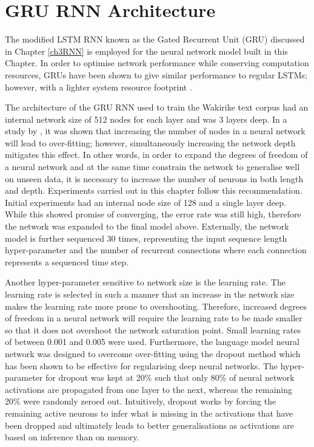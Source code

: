 \section{GRU RNN Architecture}
The modified LSTM RNN known as the Gated Recurrent Unit (GRU) discussed in Chapter \ref{ch3RNN} is employed for the neural network model built in this Chapter.  In order to optimise network performance while conserving computation resources, GRUs have been shown to give similar performance to regular LSTMs; however, with a lighter system resource footprint \citep{cho2014learning}. 

The architecture of the GRU RNN used to train the Wakirike text corpus had an internal network size of 512 nodes for each layer and was 3 layers deep. In a study by \citep{goodfellow2013multi}, it was shown that increasing the number of nodes in a neural network will lead to over-fitting; however, simultaneously increasing the network depth mitigates this effect.  In other words, in order to expand the degrees of freedom of a neural network and at the same time constrain the network to generalise well on unseen data, it is necessary to increase the number of neurons in both length and depth.  Experiments carried out in this chapter follow this recommendation. Initial experiments had an internal node size of 128 and a single layer deep.  While this showed promise of converging, the error rate was still high, therefore the network was expanded to the final model above.   Externally, the network model is further  sequenced 30 times, representing the input sequence length hyper-parameter and the number of recurrent connections where each connection represents a sequenced time step. 

Another hyper-parameter sensitive to network size is the learning rate.  The learning rate is selected in such a manner that an increase in the network size makes the learning rate more prone to overshooting.  Therefore, increased degrees of freedom in a neural network will require the learning rate to be made smaller so that it does not overshoot the network saturation point.  Small learning rates of between 0.001 and 0.005 were used. Furthermore, the language model neural network was designed to overcome over-fitting using the dropout method \citep{srivastava2014dropout} which has been shown to be effective for regularising deep neural networks.  The hyper-parameter for dropout was kept at 20\% such that only 80\% of neural network activations are propagated from one layer to the next, whereas the remaining 20\% were randomly zeroed out.  Intuitively, dropout works by forcing the remaining active neurons to infer what is missing in the activations that have been dropped and ultimately leads to better generalisations as activations are based on inference than on memory.

